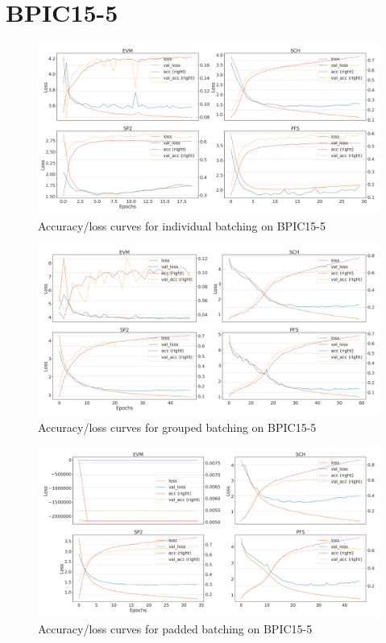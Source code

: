 \section*{BPIC15-5}
\begin{figure}[!htb]
    \centering
    \includegraphics[width=\textwidth]{gfx/bpic2015_5/individual_loss_acc_curve.png}
    \caption{Accuracy/loss curves for individual batching on BPIC15-5}
\end{figure}
\begin{figure}[!htb]
    \centering
    \includegraphics[width=\textwidth]{gfx/bpic2015_5/grouped_loss_acc_curve.png}
    \caption{Accuracy/loss curves for grouped batching on BPIC15-5}
\end{figure}
\begin{figure}[!htb]
    \centering
    \includegraphics[width=\textwidth]{gfx/bpic2015_5/padded_loss_acc_curve.png}
    \caption{Accuracy/loss curves for padded batching on BPIC15-5}
\end{figure}

